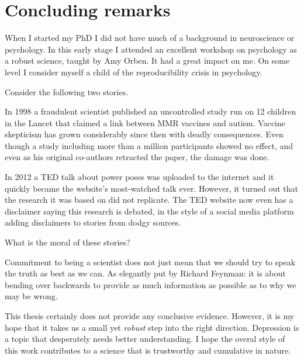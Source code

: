 \clearpage
\section{Concluding remarks}
\label{sec:concluding-remarks}

When I started my PhD I did not have much of a background in neuroscience or psychology.
In this early stage I attended an excellent workshop on psychology as a robust science, taught by Amy Orben.
It had a great impact on me.
On some level I consider myself a child of the reproducibility crisis in psychology.

Consider the following two stories.

In 1998 a fraudulent scientist published an uncontrolled study run on 12 children in the Lancet that claimed a link between MMR vaccines and autism.
Vaccine skepticism has grown considerably since then with deadly consequences.
Even though a study including more than a million participants showed no effect, and even as his original co-authors retracted the paper, the damage was done.

In 2012 a TED talk about power poses was uploaded to the internet and it quickly became the website's most-watched talk ever.
However, it turned out that the research it was based on did not replicate.
The TED website now even has a disclaimer saying this research is debated, in the style of a social media platform adding disclaimers to stories from dodgy sources.

What is the moral of these stories?

Commitment to being a scientist does not just mean that we should try to speak the truth as best as we can.
As elegantly put by Richard Feynman: it is about bending over backwards to provide as much information as possible as to why we may be wrong.

This thesis certainly does not provide any conclusive evidence.
However, it is my hope that it takes us a small yet \emph{robust} step into the right direction.
Depression is a topic that desperately needs better understanding.
I hope the overal style of this work contributes to a science that is trustworthy and cumulative in nature.
